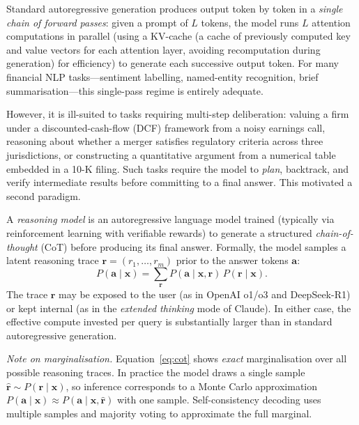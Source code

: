 \begin{context}
Standard autoregressive generation produces output token by token in a \emph{single
chain of forward passes}: given a prompt of $L$ tokens, the model runs $L$ attention
computations in parallel (using a KV-cache (a cache of previously computed key and value vectors for each attention layer, avoiding recomputation during generation) for efficiency) to generate each successive
output token.  For many financial NLP tasks---sentiment labelling, named-entity
recognition, brief summarisation---this single-pass regime is entirely adequate.

However, it is ill-suited to tasks requiring multi-step deliberation: valuing a firm
under a discounted-cash-flow (DCF) framework from a noisy earnings call, reasoning
about whether a merger satisfies regulatory criteria across three jurisdictions, or
constructing a quantitative argument from a numerical table embedded in a 10-K filing.
Such tasks require the model to \emph{plan}, backtrack, and verify intermediate
results before committing to a final answer.  This motivated a second paradigm.

\begin{definition}
\label{def:reasoning}
A \emph{reasoning model} is an autoregressive language model trained (typically via
reinforcement learning with verifiable rewards) to generate a structured
\emph{chain-of-thought} (CoT) before producing its final answer.  Formally, the
model samples a latent reasoning trace $\mathbf{r} = (r_1, \ldots, r_m)$ prior to
the answer tokens $\mathbf{a}$:
\begin{equation}
  P(\mathbf{a} \mid \mathbf{x})
  = \sum_{\mathbf{r}} P(\mathbf{a} \mid \mathbf{x}, \mathbf{r})\,
    P(\mathbf{r} \mid \mathbf{x}).
  \label{eq:cot}
\end{equation}
The trace $\mathbf{r}$ may be exposed to the user (as in OpenAI o1/o3 and
DeepSeek-R1) or kept internal (as in the \emph{extended thinking} mode of
Claude).  In either case, the effective compute invested per query is
substantially larger than in standard autoregressive generation.

\emph{Note on marginalisation.}  Equation~\eqref{eq:cot} shows \emph{exact}
marginalisation over all possible reasoning traces.  In practice the model
draws a single sample $\hat{\mathbf{r}} \sim P(\mathbf{r} \mid \mathbf{x})$,
so inference corresponds to a Monte Carlo approximation
$P(\mathbf{a} \mid \mathbf{x}) \approx P(\mathbf{a} \mid \mathbf{x}, \hat{\mathbf{r}})$
with one sample.  Self-consistency decoding \citep{wang2022selfconsistency} uses
multiple samples and majority voting to approximate the full marginal.
\end{definition}


\end{context}
